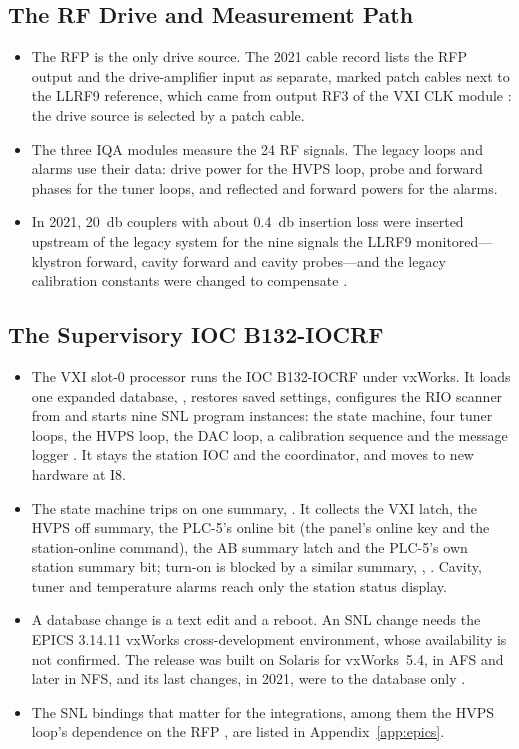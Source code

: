\subsection{The RF Drive and Measurement Path}\label{sec:rfpath}

\begin{itemize}
\item The RFP is the only drive source. The 2021 cable record lists the RFP output and
the drive-amplifier input as separate, marked patch cables next to the LLRF9
reference, which came from output RF3 of the VXI CLK module : the drive source
is selected by a patch cable.
\item The three IQA modules measure the 24 RF signals. The legacy loops and alarms use
their data: drive power for the HVPS loop, probe and forward phases for the tuner
loops, and reflected and forward powers for the alarms.
\item In 2021, \qty{20}{\decibel} couplers with about \qty{0.4}{\decibel} insertion
loss were inserted upstream of the legacy system for the nine signals the LLRF9
monitored---klystron forward, cavity forward and cavity probes---and the legacy
calibration constants were changed to compensate .
\end{itemize}

\subsection{The Supervisory IOC B132-IOCRF}\label{sec:ioc}

\begin{itemize}
\item The VXI slot-0 processor runs the IOC \mbox{B132-IOCRF} under vxWorks. It loads
one expanded database, , restores saved settings, configures the RIO
scanner from  and starts nine SNL program instances: the state
machine, four tuner loops, the HVPS loop, the DAC loop, a calibration sequence and the
message logger . It stays the station IOC and the coordinator, and moves to new
hardware at I8.
\item The state machine trips on one summary, . It
collects the VXI latch, the HVPS off summary, the PLC-5's online bit (the panel's
online key and the station-online command), the AB summary latch and the PLC-5's own
station summary bit; turn-on
is blocked by a similar summary,  , . Cavity,
tuner and temperature alarms reach only the station status display.
\item A database change is a text edit and a reboot. An SNL change needs the EPICS
3.14.11 vxWorks cross-development environment, whose availability is not
confirmed. The release was built on Solaris for vxWorks~5.4, in AFS and
later in NFS, and its last changes, in 2021, were to the database only .
\item The SNL bindings that matter for the integrations, among them the HVPS loop's
dependence on the RFP , are listed in Appendix~\ref*{app:epics}.
\end{itemize}

